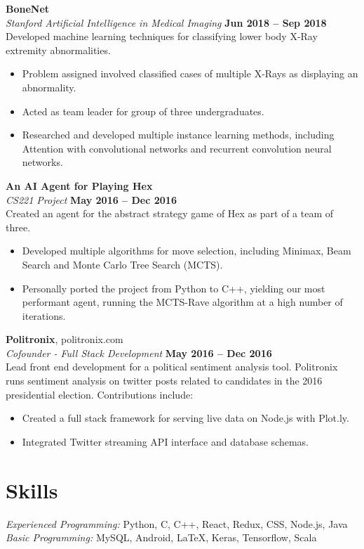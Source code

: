\documentclass[margin,line]{resume}
\begin{document}
\begin{resume}
    \textbf{BoneNet} \vspace{2mm}\\\vspace{1mm}%
   	\textsl{Stanford Artificial Intelligence in Medical Imaging} \hfill \textbf{Jun 2018 -- Sep 2018}\\
    Developed machine learning techniques for classifying lower body X-Ray extremity abnormalities.
    \begin{itemize}
	\setlength\itemsep{-0.05em}
        \item Problem assigned involved classified cases of multiple X-Rays as displaying an abnormality.
        \item Acted as team leader for group of three undergraduates.
        \item Researched and developed multiple instance learning methods, including Attention with convolutional networks and recurrent convolution neural networks.
    \end{itemize}

    \textbf{An AI Agent for Playing Hex} \vspace{2mm}\\\vspace{1mm}%
    \textsl{CS221 Project} \hfill \textbf{May 2016 -- Dec 2016}\\
    Created an agent for the abstract strategy game of Hex as part of a team of three.
    \begin{itemize}
	\setlength\itemsep{-0.05em}
    	\item Developed multiple algorithms for move selection, including Minimax, Beam Search and Monte Carlo Tree Search (MCTS).
        \item Personally ported the project from Python to C++, yielding our most performant agent, running the MCTS-Rave algorithm at a high number of iterations.
    \end{itemize}
    
    \textbf{Politronix}, politronix.com \vspace{2mm}\\\vspace{1mm}%
    \textsl{Cofounder - Full Stack Development} \hfill \textbf{May 2016 -- Dec 2016}\\
    Lead front end development for a political sentiment analysis tool. Politronix runs sentiment analysis on twitter posts related to candidates in the 2016 presidential election. Contributions include:
    \begin{itemize}
	\setlength\itemsep{-0.05em}
        \item Created a full stack framework for serving live data on Node.js with Plot.ly.
        \item Integrated Twitter streaming API interface and database schemas.
    \end{itemize}

    \section{\mysidestyle Skills}

    \emph{Experienced Programming:} Python, C, C++, React, Redux, CSS, Node.js, Java \\
    \emph{Basic Programming:} MySQL, Android, \LaTeX, Keras, Tensorflow, Scala
\end{resume}
\end{document}
